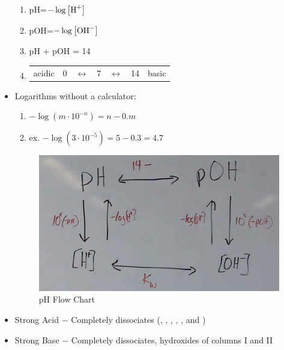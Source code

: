 \documentclass[12pt]{article}
\begin{document}
\begin{itemize}
\begin{enumerate}
      \item pH=$-\log\left[ \ce{H+} \right]$

      \item pOH=$-\log\left[ \ce{OH-} \right]$

      \item pH + pOH = 14

      \item \begin{tabular}[H]{c c c c c c c}
          acidic & 0 & $\leftrightarrow$ & 7 & $\leftrightarrow$ & 14 & basic
        \end{tabular}

    \end{enumerate}

  \item Logarithms without a calculator:

    \begin{enumerate}

      \item $-\log\left( m\cdot10^{-n} \right)=n-0.m$

      \item ex. $-\log\left( 3\cdot10^{-5} \right)=5-0.3=4.7$

    \end{enumerate}

    \begin{center}
    \begin{figure}[H]
      \centering
      \includegraphics[width=.7\textwidth]{Figures/pHflow.png}
      \caption{pH Flow Chart}
      \label{fig:1}
    \end{figure}
  \end{center}

\item Strong Acid $-$ Completely dissociates (, , , , , and )

\item Strong Base $-$ Completely dissociates, hydroxides of columns I and II

\end{itemize}
\end{document}
